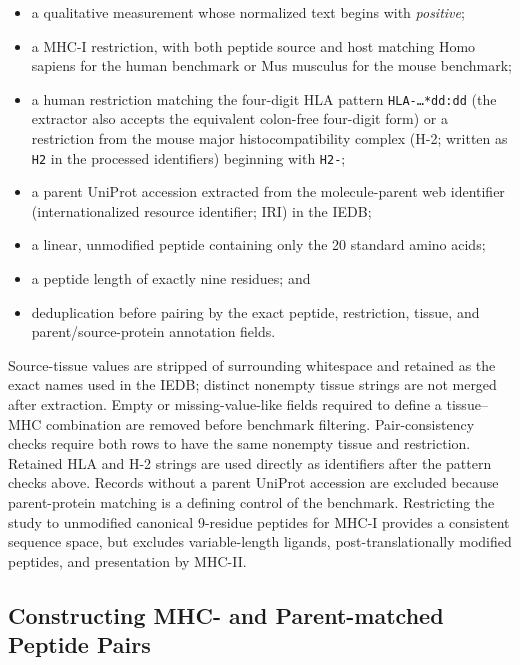 \documentclass[webpdf,modern,large,nocrop,noinfo]{oup-authoring-template}
\newcommand{\plainMHCI}{MHC-I}
\newcommand{\plainHLA}{HLA}
\newcommand{\plainHtwo}{H-2}
\newcommand{\plainIEDB}{IEDB}
\begin{document}
\begin{itemize}
    \item a qualitative measurement whose normalized text begins with \emph{positive};
    \item a \plainMHCI{} restriction, with both peptide source and host matching Homo sapiens for the human benchmark or Mus musculus for the mouse benchmark;
    \item a human restriction matching the four-digit \plainHLA{} pattern \texttt{HLA-\ldots{}*dd:dd} (the extractor also accepts the equivalent colon-free four-digit form) or a restriction from the mouse major histocompatibility complex (\plainHtwo{}; written as \texttt{H2} in the processed identifiers) beginning with \texttt{H2-};
    \item a parent UniProt accession extracted from the molecule-parent web identifier (internationalized resource identifier; IRI) in the \plainIEDB{};
    \item a linear, unmodified peptide containing only the 20 standard amino acids;
    \item a peptide length of exactly nine residues; and
    \item deduplication before pairing by the exact peptide, restriction, tissue, and parent/source-protein annotation fields.
\end{itemize}

Source-tissue values are stripped of surrounding whitespace and retained as the exact names used in the \plainIEDB{}; distinct nonempty tissue strings are not merged after extraction. Empty or missing-value-like fields required to define a tissue--MHC combination are removed before benchmark filtering. Pair-consistency checks require both rows to have the same nonempty tissue and restriction. Retained \plainHLA{} and \plainHtwo{} strings are used directly as identifiers after the pattern checks above. Records without a parent UniProt accession are excluded because parent-protein matching is a defining control of the benchmark. Restricting the study to unmodified canonical 9-residue peptides for \plainMHCI{} provides a consistent sequence space, but excludes variable-length ligands, post-translationally modified peptides, and presentation by MHC-II.

\subsection{Constructing MHC- and Parent-matched Peptide Pairs}
\label{sec:pair-construction}
\end{document}
